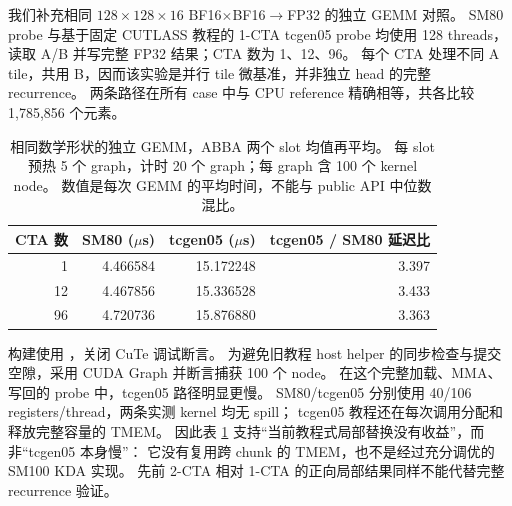 我们补充相同 \(128\times128\times16\) BF16\(\times\)BF16\(\to\)FP32 的独立 GEMM 对照。
SM80 probe 与基于固定 CUTLASS 教程的 1-CTA tcgen05 probe 均使用 128 threads，
读取 A/B 并写完整 FP32 结果；CTA 数为 1、12、96。
每个 CTA 处理不同 A tile，共用 B，因而该实验是并行 tile 微基准，并非独立 head 的完整 recurrence。
两条路径在所有 case 中与 CPU reference 精确相等，共各比较 1,785,856 个元素。

\begin{table}[htbp]\centering\small
\begin{tabular}{rrrr}\toprule
CTA 数&SM80 (\(\mu\)s)&tcgen05 (\(\mu\)s)&tcgen05 / SM80 延迟比\\\midrule
1&4.466584&15.172248&3.397\\
12&4.467856&15.336528&3.433\\
96&4.720736&15.876880&3.363\\\bottomrule
\end{tabular}
\caption{相同数学形状的独立 GEMM，ABBA 两个 slot 均值再平均。
每 slot 预热 5 个 graph，计时 20 个 graph；每 graph 含 100 个 kernel node。
数值是每次 GEMM 的平均时间，不能与 public API 中位数混比。}
\label{tab:mma}
\end{table}

构建使用 ，关闭 CuTe 调试断言。
为避免旧教程 host helper 的同步检查与提交空隙，采用 CUDA Graph 并断言捕获 100 个 node。
在这个完整加载、MMA、写回的 probe 中，tcgen05 路径明显更慢。
SM80/tcgen05 分别使用 40/106 registers/thread，两条实测 kernel 均无 spill；
tcgen05 教程还在每次调用分配和释放完整容量的 TMEM。
因此表 \ref{tab:mma} 支持“当前教程式局部替换没有收益”，而非“tcgen05 本身慢”：
它没有复用跨 chunk 的 TMEM，也不是经过充分调优的 SM100 KDA 实现。
先前 2-CTA 相对 1-CTA 的正向局部结果同样不能代替完整 recurrence 验证。
